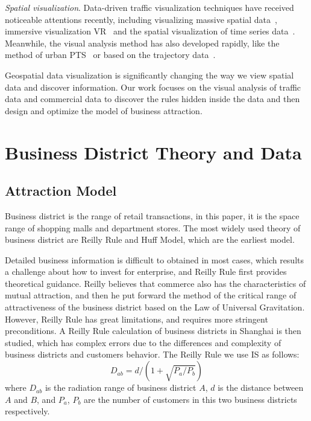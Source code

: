\documentclass[journal]{IEEEtran}
\begin{document}
\emph{Spatial visualization}. Data-driven traffic visualization techniques have received noticeable attentions recently, including visualizing massive spatial data~\cite{Standart2011Geospatial}, immersive visualization VR~\cite{Berberich2009Geospatial} and the spatial visualization of time series data~\cite{Standart2011Geospatial}. Meanwhile, the visual analysis method has also developed rapidly, like the method of urban PTS~\cite{Zhang2017A} or based on the trajectory data~\cite{2016Multi}.

Geospatial data visualization is significantly changing the way we view spatial data and discover information. Our work focuses on the visual analysis of traffic data and commercial data to discover the rules hidden inside the data and then design and optimize the model of business attraction.



\section{Business District Theory and Data}

\subsection{Attraction Model}

Business district is the range of retail transactions, in this paper, it is the space range of shopping malls and department stores. The most widely used theory of business district are Reilly Rule and Huff Model, which are the earliest model. 

Detailed business information is difficult to obtained in most cases, which results a challenge about how to invest for enterprise, and Reilly Rule first provides theoretical guidance. Reilly believes that commerce also has the characteristics of mutual attraction, and then he put forward the method of the critical range of attractiveness of the business district based on the Law of Universal Gravitation. However, Reilly Rule has great limitations, and requires more stringent preconditions. A Reilly Rule calculation of business districts in Shanghai is then studied, which has complex errors due to the differences and complexity of business districts and customers behavior. The Reilly Rule we use IS as follows:
\begin{equation}
D_{ab}=d/(1+\sqrt{P_{a}/P_{b}})
\end{equation}
where $D_{ab}$ is the radiation range of business district $A$, $d$ is the distance between $A$ and $B$, and $P_{a}$, $P_{b}$ are the number of customers in this two business districts respectively.
\end{document}
